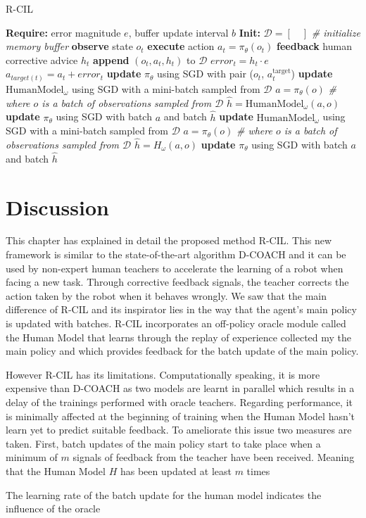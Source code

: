 \begin{algorithm}[H]
\caption{R-CIL}\label{algorithm:R-CIL}
\begin{algorithmic}[1]
\State \textbf{Require:} error magnitude $e$, buffer update interval $b$
\State \textbf{Init:} $\mathcal{D} = [\quad]$  \emph{\# initialize memory buffer}
\State \textbf{observe} state $o_{t}$
\State \textbf{execute} action $a_{t}=\pi_{\theta}(o_{t})$
\State \textbf{feedback} human corrective advice $h_{t}$
\State \textbf{append} $(o_{t}, a_{t}, h_{t})$ to $\mathcal{D}$
\State $\mathit{error}_{t} = h_{t}\cdot e$
\State $a_{target(t)} = a_{t} + \mathit{error}_{t}$
\State \textbf{update} $\pi_\theta$ using SGD with pair ($o_{t}$, $a^{\text{target}}_{t}$)
\State \textbf{update} $\text{HumanModel}_\omega$ using SGD with a mini-batch sampled from $\mathcal{D}$
\State  $a=\pi_{\theta}(o)$ \emph{\# where $o$ is a batch of observations sampled from $\mathcal{D}$}
\State  $\hat{h}=\text{HumanModel}_\omega(a, o)$
\State \textbf{update} $\pi_\theta$ using SGD with batch $a$ and batch $\hat{h}$
\EndIf
{}
\State \textbf{update} $\text{HumanModel}_\omega$ using SGD with a mini-batch sampled from $\mathcal{D}$
\State  $a=\pi_{\theta}(o)$ \emph{\# where $o$ is a batch of observations sampled from $\mathcal{D}$}
\State  $\hat{h}=H_\omega(a, o)$
\State \textbf{update} $\pi_{\theta}$ using SGD with batch $a$ and batch $\hat{h}$
\EndIf
\EndFor
\end{algorithmic}
\label{al:D-COACH with HM}
\end{algorithm}


\section{Discussion}
\label{section:Algorithm-Discussion}
This chapter has explained in detail the proposed method R-CIL. This new framework is similar to the state-of-the-art algorithm D-COACH and it can be used by non-expert human teachers to accelerate the learning of a robot when facing a new task. Through corrective feedback signals, the teacher corrects the action taken by the robot when it behaves wrongly. We saw that the main difference of R-CIL and its inspirator lies in the way that the agent's main policy is updated with batches. R-CIL incorporates an off-policy oracle module called the Human Model that learns through the replay of experience collected my the main policy and which provides feedback for the batch update of the main policy.


However R-CIL has its limitations. Computationally speaking, it is more expensive than D-COACH as two models are learnt in parallel which results in a delay of the trainings performed with oracle teachers. Regarding performance, it is minimally affected at the beginning of training when the Human Model hasn't learn yet to predict suitable feedback.
To ameliorate this issue two measures are taken. First, batch updates of the main policy start to take place when a minimum of $m$ signals of feedback from the teacher have been received. Meaning that the Human Model $H$ has been updated at least $m$ times


The learning rate of the batch update for the human model indicates the influence of the oracle